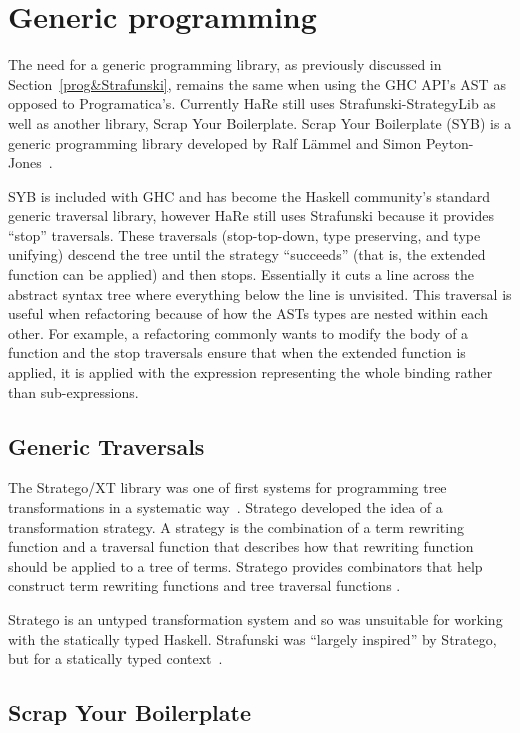 \section{Generic programming}
\label{genProg}

The need for a generic programming library, as previously discussed in Section~\ref{prog&Strafunski}, remains the same when using the GHC API's AST as opposed to Programatica's. Currently HaRe still uses Strafunski-StrategyLib as well as another library, Scrap Your Boilerplate. Scrap Your Boilerplate (SYB) is a generic programming library developed by Ralf L{\"a}mmel and Simon Peyton-Jones~\citep{syb}. 

SYB is included with GHC and has become the Haskell community's standard generic traversal library, however HaRe still uses Strafunski because it provides ``stop'' traversals. These traversals (stop-top-down, type preserving, and type unifying) descend the tree until the strategy ``succeeds'' (that is, the extended function can be applied) and then stops. Essentially it cuts a line across the abstract syntax tree where everything below the line is unvisited. This traversal is useful when refactoring because of how the ASTs types are nested within each other. For example, a refactoring commonly wants to modify the body of a function and the stop traversals ensure that when the extended function is applied, it is applied with the expression representing the whole binding rather than sub-expressions.

\subsection{Generic Traversals}
The Stratego/XT library was one of first systems for programming tree transformations in a systematic way~\citep{stratego}. Stratego developed the idea of a transformation strategy. A strategy is the combination of a term rewriting function and a traversal function that describes how that rewriting function should be applied to a tree of terms. Stratego provides combinators that help construct term rewriting functions and tree traversal functions \citep{stratego}.

Stratego is an untyped transformation system and so was unsuitable for working with the statically typed Haskell. Strafunski was ``largely inspired'' by Stratego, but for a statically typed context~\citep{strafunski}.
  
\subsection{Scrap Your Boilerplate}\label{syb}

